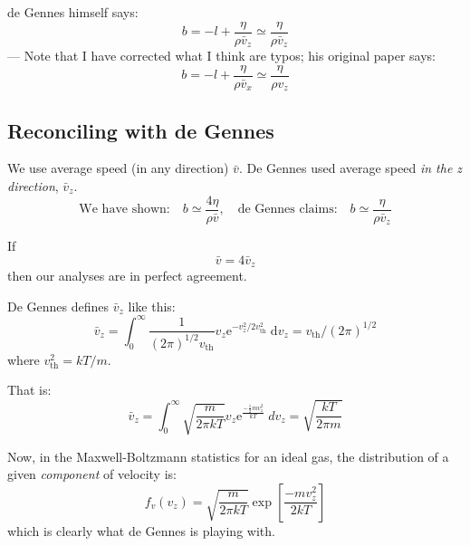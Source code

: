 \documentclass[a4paper]{report}
\begin{document}
de Gennes himself says:
\begin{equation}
b = -l + \frac{\eta}{\rho \bar{v}_{z}} \simeq  \frac{\eta}{\rho \bar{v}_{z}}
\end{equation}
--- Note that I have corrected what I think are typos; his original paper says:
\begin{equation}
 b = -l + \frac{\eta}{\rho \bar{v}_{x}} \simeq  \frac{\eta}{\rho v_{z}}
\end{equation}


\subsection*{Reconciling with de Gennes}

We use average speed (in any direction) $\bar{v}$. De Gennes used average speed \emph{in the z direction}, $\bar{v}_{z}$.
\begin{equation}
\text{We have shown:} \quad b \simeq \frac{4 \eta}{\rho \bar{v}}, \quad \text{de Gennes claims:} \quad
b \simeq \frac{\eta}{\rho \bar{v}_{z}}
\end{equation}

If 
\begin{equation}
\bar{v} = 4 \bar{v}_{z} 
\end{equation}
then our analyses are in perfect agreement.
\vspace*{1em}

De Gennes defines $\bar{v}_{z}$ like this:
\begin{equation}
\bar{v}_{z} = \int_{0}^{\infty} \frac{1}{(2 \pi)^{1/2} v_{\mathrm{th}} }
v_{z} \mathrm{e}^{-v_{z}^{2} / 2v_{\mathrm{th}}^{2}}  \; \mathrm{d} v_{z} = v_{\mathrm{th}} / (2 \pi)^{1/2}
\end{equation}
where $v_{\mathrm{th}}^{2} =  kT/m $.

That is:
\begin{equation}
\bar{v}_{z} = \int_{0}^{\infty} \sqrt{\frac{m}{2 \pi k T}} v_{z} 
   \mathrm{e}^{\frac{- \frac{1}{2} m v_{z}^{2}}{kT}} \; dv_{z} = 
   \sqrt{\frac{kT}{2 \pi m}}
\end{equation}
   
Now, in the Maxwell-Boltzmann statistics for an ideal gas, the distribution of a given \emph{component} of velocity is:
\begin{equation}
f_{v}(v_{z}) = \sqrt{\frac{m}{2 \pi k T}} \exp
  \left[ \frac{-m v_{z}^{2}}{2 k T} \right]
\end{equation}
which is clearly what de Gennes is playing with.
\end{document}

